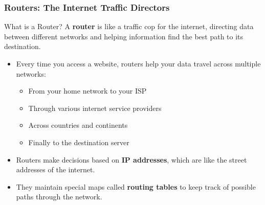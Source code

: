 \documentclass{beamer}
\begin{document}
\begin{frame}
    \frametitle{Routers: The Internet Traffic Directors}
    
    \begin{alertblock}{What is a Router?}
        A \textbf{router} is like a traffic cop for the internet, directing data between different networks and helping information find the best path to its destination.
    \end{alertblock}
    
    \begin{itemize}
        \item Every time you access a website, routers help your data travel across multiple networks:
        \begin{itemize}
            \item From your home network to your ISP
            \item Through various internet service providers
            \item Across countries and continents
            \item Finally to the destination server
        \end{itemize}
        
        \item Routers make decisions based on \textbf{IP addresses}, which are like the street addresses of the internet.
        
        \item They maintain special maps called \textbf{routing tables} to keep track of possible paths through the network.
    \end{itemize}
\end{frame}
\end{document}
